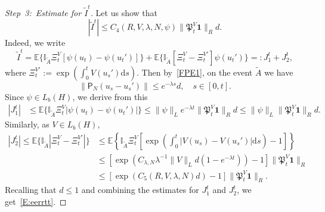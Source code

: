 \documentclass[AHL,Unicode,longabstracts]{cedram}
\newcommand{\I}{{\mathbb I}}
\newcommand{\E}{{\mathbb E}}
\newcommand{\la}{\lambda}
\newcommand{\pp}{{{\mathsf P}_N}}
\newcommand{\PPPP}{{\mathfrak P}}
\newcommand{\dd}{\mathrm{d}}
\newenvironment{step}{\begin{proof}}{\let\qed\relax \end{proof}}
\begin{document}
\begin{step}[Step~3:~Estimate for $\tilde I^t$]
Let us show that
\begin{equation}\label{E:eerrtt}
|\tilde I^{t}|\le C_{4}(R,V,\la,N, \psi) \|\PPPP_t^V{\mathbf1}\|_R d.
\end{equation}
Indeed, we write
\[
\tilde I^t =\E\bigl\{\I_{\tilde A}\Xi^V_t[\psi (u_t)-\psi (u_t')] \bigr\}+\E\bigl\{\I_{\tilde A}[\Xi^V_t-\Xi^{V'}_t]\psi (u_t') \bigr\} =:J_1^t+J_2^t,
\]
where $\Xi^{V'}_t:=\exp\left(\int_{0}^tV(u_s') \dd s\right)$. Then by~\eqref{FPE1}, on the event $\tilde A$ we have
\[
\|\pp(u_s-u_s')\|
\le e^{-\lambda s}d, \quad s\in [0,t].
\]
Since $\psi\in L_b(H) $, we derive from this
\begin{align*}
|J_{1}^t|&\le \E\bigl\{\I_{\tilde A} \Xi^V_t| \psi (u_t)-\psi (u_t')| \bigr\} \le \| \psi\|_{L} e^{-\lambda t} \|\PPPP_t^V{\mathbf1}\|_R d \le \| \psi\|_{L} \|\PPPP_t^V{\mathbf1}\|_Rd.
\end{align*}
Similarly, as $V\in L_b(H)$,
\begin{align*}
|J_{2}^t| \le \E\bigl\{\I_{\tilde A}|\Xi^V_t-\Xi^{V'}_t| \bigr\} &\le \E\left\{\I_{\tilde A}\Xi^V_t \left[\exp\left(\int_{0}^t|V(u_s)-V(u_s')| \dd s\right)-1 \right] \right\}\\&\le \left[\exp\left(C_{\la,N} \lambda^{-1} \|V\|_{L} d (1-e^{-\lambda t})\right)-1 \right] \|\PPPP_t^V{\mathbf1}\|_R\\&\le \left[\exp\left(C_5(R,V,\la,N) d \right)-1 \right] \|\PPPP_t^V{\mathbf1}\|_R.
\end{align*}
Recalling that $d\le1$ and combining the estimates for $J_{1}^t$ and $J_{2}^t$, we get~\eqref{E:eerrtt}.
\end{step}
\end{document}
